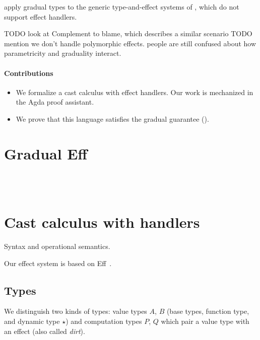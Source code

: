 \citep{bauer-pretnar-2014}
\citep{plotkin-power-2001}

\citet{schwerter-2016} apply gradual types to the generic type-and-effect systems of \citet{marino-2009},
which do not support effect handlers.


TODO look at Complement to blame, which describes a similar scenario
TODO mention we don't handle polymorphic effects.
people are still confused about how parametricity and graduality interact.

\paragraph{Contributions}

\begin{itemize}
  \item We formalize a cast calculus with effect handlers.
    Our work is mechanized in the Agda proof assistant.
  \item We prove that this language satisfies the gradual guarantee
    ().
\end{itemize}

\section{Gradual Eff}

\GEmetavars\\[0pt]
\GEgrammar\\[5.0mm]
\GEdefnss

\section{Cast calculus with handlers}

Syntax and operational semantics.

Our effect system is based on Eff~\cite{bauer2015programming}.

\subsection{Types}

We distinguish two kinds of types: value types $A$, $B$ (base types, function type, and
dynamic type $\star$) and computation types $P$, $Q$ which pair a value type with an effect (also called \emph{dirt}).

